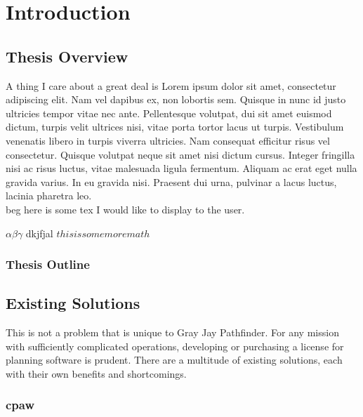 \glsresetall{} 
\chapter{Introduction}


\section{Thesis Overview}


\lettrine[lines=2, findent=0pt, nindent=5pt]{A}{} thing I care about a great deal is 
Lorem ipsum dolor sit amet, consectetur adipiscing elit. Nam vel dapibus ex, non lobortis sem. Quisque 
in nunc id justo ultricies tempor vitae nec ante. Pellentesque volutpat,
dui sit amet euismod dictum, turpis velit ultrices nisi, vitae porta 
tortor lacus ut turpis. Vestibulum venenatis libero in turpis viverra 
ultricies. Nam consequat efficitur risus vel consectetur. Quisque volutpat 
neque sit amet nisi dictum cursus. Integer fringilla nisi ac risus luctus,
vitae malesuada ligula fermentum. Aliquam ac erat eget nulla gravida 
varius. In eu gravida nisi. Praesent dui urna, pulvinar a lacus luctus,
lacinia pharetra leo. 
\\

beg
here is some tex I
would like to display to the user.

$ \alpha \beta \gamma $  dkjfjal $this is some more math$


\subsection*{Thesis Outline} 


\section{Existing Solutions}\label{sec:exsoln}

This is not a problem that is unique to Gray Jay Pathfinder.
For any mission with sufficiently complicated operations, developing or purchasing a license for planning software is prudent.
There are a multitude of existing solutions, each with their own benefits and shortcomings.




\subsection{\acrshort{cpaw}}

